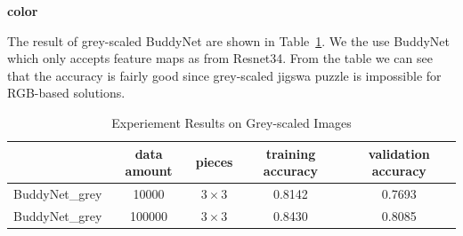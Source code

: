 \documentclass{article}
\begin{document}
\textbf{color}

The result of grey-scaled BuddyNet are shown in Table~\ref{tab:expgrey}. We the use BuddyNet which only accepts feature maps as from Resnet34. From the table we can see that the accuracy is fairly good since grey-scaled jigswa puzzle is impossible for RGB-based solutions.

\begin{table}
    \caption{Experiement Results on Grey-scaled Images}
    \centering
    \label{tab:expgrey}
    \begin{tabular}{c|c|c|c|c}
        \hline
        & data amount & pieces & training accuracy & validation accuracy\\
        \hline
        BuddyNet\_grey & 10000 & $3\times 3$ & 0.8142 & 0.7693\\
        \hline
        BuddyNet\_grey & 100000 & $3\times 3$ & 0.8430 & 0.8085\\
        \hline
    \end{tabular}
\end{table}




\end{document}
